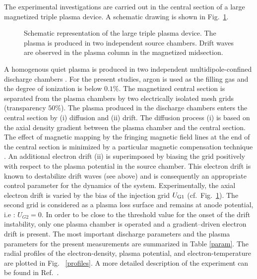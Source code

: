 The experimental investigations are carried out in the central section
of a large magnetized triple plasma device. A schematic drawing is
shown in Fig.~\ref{kiwi}. 
%
\begin{figure}[htb]
 \centering

 \caption{Schematic representation of the large triple plasma device.
          The plasma is produced in two independent source chambers.
          Drift waves are observed in the plasma column in the 
          magnetized midsection.}
 \label{kiwi}
\end{figure}
%
A homogenous quiet plasma is produced in two independent 
multidipole-confined discharge chambers \cite{limpaecher73}.
For the present studies, argon is used as the filling 
gas and the degree of ionization
is below $0.1\%$. The magnetized central section is
separated from the plasma chambers by two electrically isolated mesh
grids (transparency $50\%$). The plasma produced in the discharge
chambers enters the central section by (i) diffusion and (ii) drift.
The diffusion process (i) is based on the axial density gradient
between the plasma chamber and the central section. The effect of 
magnetic mapping by the fringing magnetic field lines at the end of the 
central section is minimized by a particular magnetic 
compensation technique 
\cite{pierre86}. An additional electron drift (ii) is superimposed by
biasing the grid positively with respect to the plasma potential in 
the source chamber. This electron drift is known to destabilize 
drift waves (see above) and is consequently an appropriate control 
parameter for the dynamics of the system. Experimentally, the axial 
electron drift is varied by the bias of the injection grid 
$U_{\rm G1}$ (cf.~Fig.~\ref{kiwi}). The second grid is considered
as a plasma loss surface and remains at anode potential, i.e :
 $U_{G2}=0$. 
In order to be close to the threshold value for the onset of the drift 
instability, only one plasma chamber is operated and a gradient--driven 
electron drift is present. The most important discharge parameters and 
the plasma parameters for the present measurements are summarized in 
Table \ref{param}. The radial profiles of the electron-density, plasma
potential, and electron-temperature are plotted in Fig.~
\ref{profiles}. A more detailed description of the experiment can 
be found in Ref.~\cite{latten95}.
%
